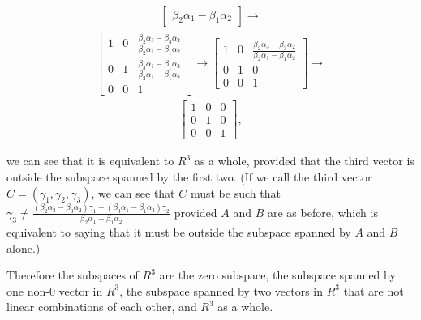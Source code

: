 \documentclass[12pt]{article}
\begin{document}
\begin{enumerate}
\begin{enumerate}
\begin{align*}
\begin{bmatrix}
                                 {\beta_2\alpha_1-\beta_1\alpha_2}
                \end{bmatrix}
                \xrightarrow{}
              \end{align*}
              \begin{align*}
                \begin{bmatrix}
                  1 & 0 & \frac{\beta_2\alpha_3-\beta_3\alpha_2}
                               {\beta_2\alpha_1-\beta_1\alpha_2}\\
                  0 & 1 & \frac{\beta_3\alpha_1 -\beta_1\alpha_3}
                               {\beta_2\alpha_1 - \beta_1\alpha_2}\\
                  0 & 0 & 1
                \end{bmatrix}
                \xrightarrow{}
                \begin{bmatrix}
                  1 & 0 & \frac{\beta_2\alpha_3-\beta_3\alpha_2}
                               {\beta_2\alpha_1-\beta_1\alpha_2}\\
                  0 & 1 & 0\\
                  0 & 0 & 1
                \end{bmatrix}
                \xrightarrow{}
              \end{align*}
              \begin{align*}
                \begin{bmatrix}
                  1 & 0 & 0\\
                  0 & 1 & 0\\
                  0 & 0 & 1
                \end{bmatrix},
              \end{align*}

              we can see that it is equivalent to $R^3$ as a whole, provided that the
              third vector is outside the subspace spanned by the first two. (If we call the
              third vector $C = (\gamma_1,\gamma_2,\gamma_3)$, we can see that $C$
              must be such that $\gamma_3 \neq
              \frac{(\beta_2\alpha_3-\beta_3\alpha_2)\gamma_1 + (\beta_3\alpha_1
              -\beta_1\alpha_3)\gamma_2} {\beta_2\alpha_1-\beta_1\alpha_2}$ provided
              $A$ and $B$ are as before, which is equivalent to saying that it must
              be outside the subspace spanned by $A$ and $B$ alone.)

              Therefore the subspaces of $R^3$ are the zero subspace, the subspace
              spanned by one non-$0$ vector in $R^3$, the subspace spanned by two
              vectors in $R^3$ that are not linear combinations of each other, and
              $R^3$ as a whole.
          \end{enumerate}


\end{enumerate}
\end{document}

